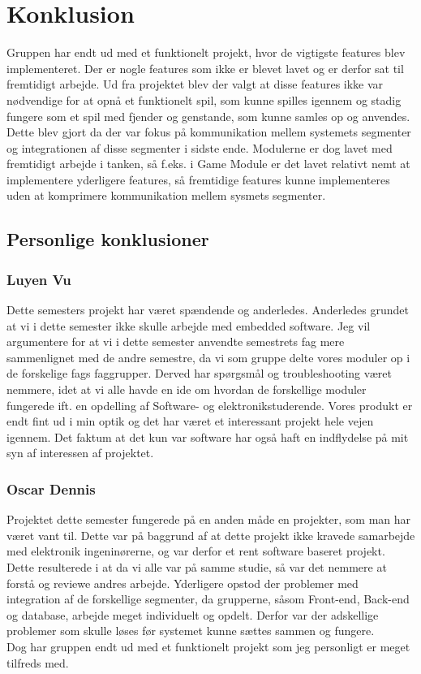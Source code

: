 \section{Konklusion}
Gruppen har endt ud med et funktionelt projekt, hvor de vigtigste features blev implementeret. Der er nogle features som ikke er blevet lavet og er derfor sat til fremtidigt arbejde. Ud fra projektet blev der valgt at disse features ikke var nødvendige for at opnå et funktionelt spil, som kunne spilles igennem og stadig fungere som et spil med fjender og genstande, som kunne samles op og anvendes.\\ Dette blev gjort da der var fokus på kommunikation mellem systemets segmenter og integrationen af disse segmenter i sidste ende. Modulerne er dog lavet med fremtidigt arbejde i tanken, så f.eks. i Game Module er det lavet relativt nemt at implementere yderligere features, så fremtidige features kunne implementeres uden at komprimere kommunikation mellem sysmets segmenter.
\subsection{Personlige konklusioner}

\subsubsection{Luyen Vu}
Dette semesters projekt har været spændende og anderledes. Anderledes grundet at vi i dette semester ikke skulle arbejde med embedded software. Jeg vil argumentere for at vi i dette semester anvendte semestrets fag mere sammenlignet med de andre semestre, da vi som gruppe delte vores moduler op i de forskelige fags faggrupper. Derved har spørgsmål og troubleshooting været nemmere, idet at vi alle havde en ide om hvordan de forskellige moduler fungerede ift. en opdelling af Software- og elektronikstuderende. 
Vores produkt er endt fint ud i min optik og det har været et interessant projekt hele vejen igennem. Det faktum at det kun var software har også haft en indflydelse på mit syn af interessen af projektet.

\subsubsection{Oscar Dennis}
Projektet dette semester fungerede på en anden måde en projekter, som man har været vant til. Dette var på baggrund af at dette projekt ikke kravede samarbejde med elektronik ingeninørerne, og var derfor et rent software baseret projekt. Dette resulterede i at da vi alle var på samme studie, så var det nemmere at forstå og reviewe andres arbejde. Yderligere opstod der problemer med integration af de forskellige segmenter, da grupperne, såsom Front-end, Back-end og database, arbejde meget individuelt og opdelt. Derfor var der adskellige problemer som skulle løses før systemet kunne sættes sammen og fungere.\\
Dog har gruppen endt ud med et funktionelt projekt som jeg personligt er meget tilfreds med.